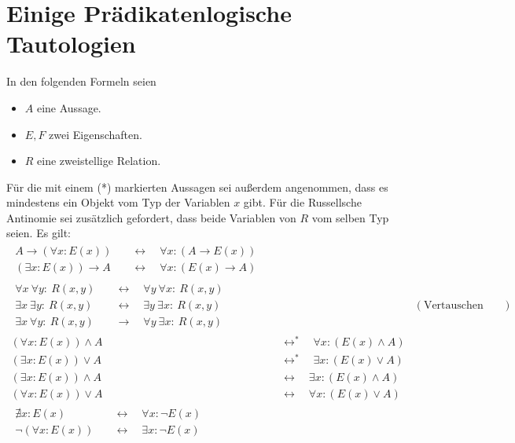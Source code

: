 \section{Einige Prädikatenlogische Tautologien}
In den folgenden Formeln seien
\begin{itemize}
    \item $A$ eine Aussage.
    \item $E,F$ zwei Eigenschaften.
    \item $R$ eine zweistellige Relation.
\end{itemize}
Für die mit einem (*) markierten Aussagen sei außerdem angenommen, dass es mindestens ein Objekt vom Typ der Variablen $x$ gibt. Für die Russellsche Antinomie sei zusätzlich gefordert, dass beide Variablen von $R$ vom selben Typ seien. Es gilt:
\begingroup
\allowdisplaybreaks
\begin{align*}
    \begin{split}
        A \to (\forall x : E(x)) & \quad\leftrightarrow\quad \forall x : (A \to E(x)) \\
        (\exists x : E(x)) \to A & \quad\leftrightarrow\quad \forall x : (E(x) \to A)
    \end{split} \\[1em]
    \begin{split}
        \forall x\ \forall y:\ R(x,y) & \quad\leftrightarrow\quad \forall y\ \forall x:\ R(x,y) \\
        \exists x\ \exists y:\ R(x,y) & \quad\leftrightarrow\quad \exists y\ \exists x:\ R(x,y) \\
        \exists x\ \forall y:\ R(x,y) & \quad\to\quad \forall y\ \exists x:\ R(x,y)
    \end{split} && (\text{Vertauschen von Quantoren}) \\[1em]
    (\forall x : E(x)) \land A &  \quad\leftrightarrow^*\quad  \forall x :(E(x) \land A) \\
    (\exists x : E(x)) \lor A &  \quad\leftrightarrow^*\quad  \exists x : (E(x) \lor A) \\
    (\exists x : E(x)) \land A &  \quad\leftrightarrow\quad  \exists x : (E(x) \land A) \\
    (\forall x : E(x)) \lor A &  \quad\leftrightarrow\quad  \forall x :(E(x) \lor A) \\[1em] %
    \begin{split}
        \nexists x: E(x) & \quad\leftrightarrow\quad \forall x: \neg E(x) \\
        \neg (\forall x: E(x)) & \quad\leftrightarrow\quad \exists x: \neg E(x) %

\end{split}
\end{align*}
